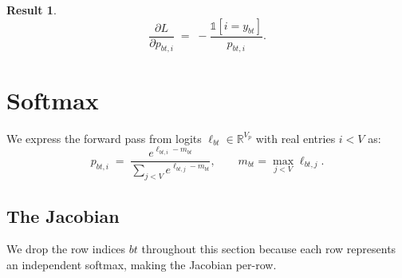 \documentclass[letterpaper, 10 pt, conference]{ieeeconf}
\newcommand{\R}{\mathbb{R}}
\newcommand{\pdv}[2]{\frac{\partial #1}{\partial #2}}
\newcommand{\dL}[1]{\pdv{L}{#1}}
\newcommand{\ind}[1]{\mathbb{1}\!\left[#1\right]}
\theoremstyle{definition}
\newtheorem*{result}{Result}
\begin{document}
\begin{result}
  \begin{equation}
    \dL{p_{bt,i}} \;=\; -\frac{\ind{i = y_{bt}}}{p_{bt,i}}.
    \label{eq:ce-bwd}
  \end{equation}
\end{result}

\section{Softmax}\label{sec:softmax}

We express the forward pass from logits $\ell_{bt} \in \R^{V_p}$ with real entries $i < V$ as:
\begin{equation}
  p_{bt,i} \;=\; \frac{e^{\ell_{bt,i} - m_{bt}}}{\sum_{j<V} e^{\ell_{bt,j} - m_{bt}}},
  \qquad m_{bt} = \max_{j<V} \ell_{bt,j}.
  \label{eq:softmax-fwd}
\end{equation}

\subsection{The Jacobian}

We drop the row indices $bt$ throughout this section because each row represents an independent softmax, making the Jacobian per-row.
\end{document}
